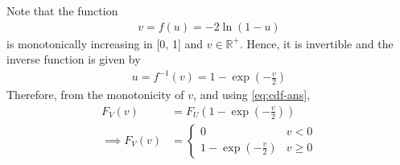 \documentclass[journal,12pt,twocolumn]{IEEEtran}
\renewcommand\thesection{\arabic{section}}
\begin{document}
\begin{enumerate}[label=\thesection.\arabic*
,ref=\thesection.\theenumi]
\solution
Note that the function 
		\begin{align}
			v = f(u) = -2\ln{(1 - u)}
		\end{align}
is monotonically increasing in [0, 1] and $v \in \mathbb{R^+}$. Hence, it is invertible and the inverse function is given by
		\begin{align}
			u = f^{-1}(v) = 1 - \exp{\left(-\frac{v}{2}\right)}
		\end{align}
		Therefore, from the monotonicity of $v$, and using \eqref{eq:cdf-ans},
		\begin{align}
			F_V(v) &= F_U\left(1 - \exp{\left(-\frac{v}{2}\right)}\right) \\
			\implies F_V(v) &= 
			\begin{cases}
				0 & v < 0 \\
				1 - \exp{\left(-\frac{v}{2}\right)} & v \geq 0
			\end{cases}
			\label{eq:f-v}
		\end{align}
%
\end{enumerate}
\end{document}
